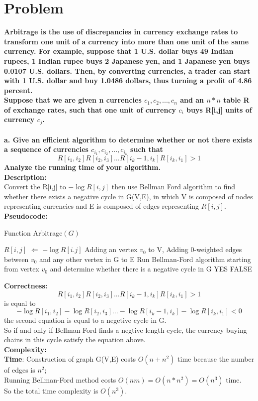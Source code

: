 \documentclass{article}
\begin{document}
\section{Problem \uppercase\expandafter{}}
\textbf{Arbitrage is the use of discrepancies in currency exchange rates to transform one
unit of a currency into more than one unit of the same currency. For example,
suppose that 1 U.S. dollar buys 49 Indian rupees, 1 Indian rupee buys 2 Japanese
yen, and 1 Japanese yen buys 0.0107 U.S. dollars. Then, by converting currencies,
a trader can start with 1 U.S. dollar and buy 1.0486 dollars,
thus turning a profit of 4.86 percent.\\
Suppose that we are given n currencies $c_1, c_2,...,c_n$ and an $n*n$ table R of
exchange rates, such that one unit of currency $c_i$ buys R[i,j] units of currency $c_j$.\\\\
a. Give an efficient algorithm to determine whether or not there exists a sequence
of currencies $c_{i_1}, c_{i_2},...,c_{i_k}$ such that
$$R[i_1,i_2]R[i_2,i_3]...R[i_k-1,i_k]R[i_k,i_1]>1$$
Analyze the running time of your algorithm.\\}
\textbf{\large Description:\\}
Convert the R[i,j] to $-\log R[i,j]$ then use Bellman Ford algorithm to find whether there exists a negative cycle in G(V,E), in which V is composed of nodes representing currencies and E is composed of edges representing $R[i,j]$.\\
\textbf{\large Pseudocode:\\}
\begin{algorithm}[H]
  \caption{Function Arbitrage$(G)$}
  \label{alg1}
  \begin{algorithmic}
  \STATE $R[i,j]$ $\Longleftarrow$ $-\log R[i.j]$
  \ENDFOR
  \STATE Adding an vertex $v_0$ to V, Adding 0-weighted edges between $v_0$ and any other vertex in G to E 
  \STATE Run Bellman-Ford algorithm starting from vertex $v_0$ and determine whether there is a negative cycle in G
  \RETURN YES
  \ENDIF
  \RETURN FALSE
  \end{algorithmic}
\end{algorithm}
\noindent\textbf{\large Correctness:\\}
$$R[i_1,i_2]R[i_2,i_3]...R[i_k-1,i_k]R[i_k,i_1]>1$$ is equal to $$-\log{R[i_1,i_2]}-\log{R[i_2,i_3]}...-\log{R[i_k-1,i_k]}-\log{R[i_k,i_1]<0}$$ 
the second equation is equal to a negetive cycle in G.\\
So if and only if Bellman-Ford finds a negtive length cycle, the currency buying chains in this cycle satisfy the equation above.\\
\textbf{\large Complexity:\\}
\textbf{Time}: Construction of graph G(V,E) costs $O(n+n^2)$ time because the number of edges is $n^2$;\\
Running Bellman-Ford method costs $O(nm)= O(n *n^2)=O(n^3)$ time.\\
So the total time complexity is $O(n^3)$.\\
\end{document}
